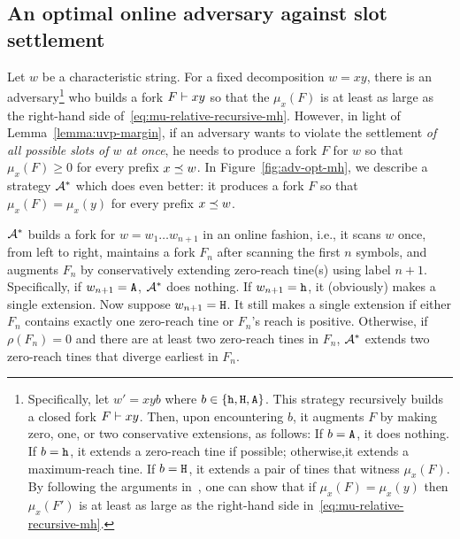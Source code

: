 








\subsection{An optimal online adversary against slot settlement}
\label{sec:opt-adversary}
Let $w$ be a characteristic string. 
For a fixed decomposition $w = xy$, 
there is an adversary\footnote{
  Specifically, 
  let $w' = xyb$ 
  where $b \in \{\mathtt{h}, \mathtt{H}, \mathtt{A}\}$. 
  This strategy recursively builds a closed fork $F \vdash xy$. 
  Then, upon encountering $b$, 
  it augments $F$ 
  by making zero, one, or two conservative extensions, as follows: 
  If $b = \mathtt{A}$, it does nothing. 
  If $b = \mathtt{h}$, it extends a zero-reach tine if possible; 
  otherwise,it extends a maximum-reach tine. 
  If $b = \mathtt{H}$, it extends a pair of tines that 
  witness $\mu_x(F)$. 
  By following the arguments in~\cite{LinearConsistencySODA}, 
  one can show that 
  if $\mu_x(F) = \mu_x(y)$ then 
  $\mu_x(F')$ is 
  at least as large as 
  the right-hand side in~\eqref{eq:mu-relative-recursive-mh}.   
} 
who builds a fork $F \vdash xy$ 
so that the $\mu_x(F)$ is 
at least as large as 
the right-hand side of~\eqref{eq:mu-relative-recursive-mh}. 
However, 
in light of Lemma~\ref{lemma:uvp-margin}, 
if an adversary wants to violate the settlement 
\emph{of all possible slots of $w$ at once}, 
he needs to produce a fork $F$ for $w$ 
so that $\mu_x(F) \geq 0$ 
for every prefix $x \preceq w$. 
In Figure~\ref{fig:adv-opt-mh}, 
we describe a strategy $\mathcal{A}^*$ 
which does even better: 
it produces a fork $F$ so that $\mu_x(F) = \mu_x(y)$ 
for every prefix $x \preceq w$. 


$\mathcal{A}^*$ builds a fork for $w = w_1 \ldots w_{n+1}$ 
in an online fashion, i.e., 
it scans $w$ once, from left to right, 
maintains a fork $F_n$ after scanning 
the first $n$ symbols, 
and augments $F_n$ by conservatively extending 
zero-reach tine(s) using label $n + 1$.
Specifically, if $w_{n+1} = \mathtt{A}$, $\mathcal{A}^*$ does nothing. 
If $w_{n+1} = \mathtt{h}$, it (obviously) makes a single extension. 
Now suppose $w_{n+1} = \mathtt{H}$. 
It still makes a single extension
if either $F_n$ contains exactly one zero-reach tine 
or $F_n$'s reach is positive. 
Otherwise, 
if $\rho(F_n) = 0$ 
and there are at least two zero-reach tines in $F_n$, 
$\mathcal{A}^*$ extends two zero-reach tines 
that diverge earliest in $F_n$.



